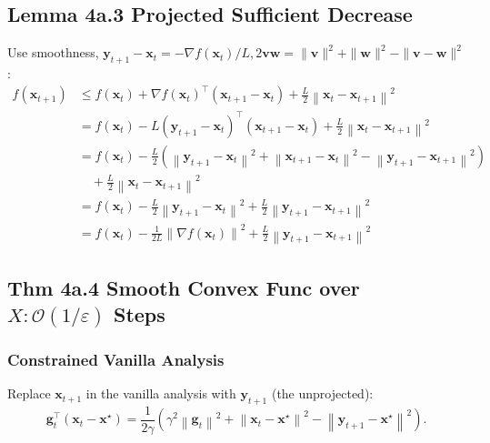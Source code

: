 \subsection*{Lemma 4a.3 Projected Sufficient Decrease}
Use smoothness, $\mathbf{y}_{t+1}-\mathbf{x}_{t}=-\nabla f\left(\mathbf{x}_{t}\right) / L, 2 \mathbf{v} \mathbf{w}=\|\mathbf{v}\|^{2}+\|\mathbf{w}\|^{2}-\|\mathbf{v}-\mathbf{w}\|^{2}$ :
$$
\begin{aligned}
f\left(\mathbf{x}_{t+1}\right) & \leq f\left(\mathbf{x}_{t}\right)+\nabla f\left(\mathbf{x}_{t}\right)^{\top}\left(\mathbf{x}_{t+1}-\mathbf{x}_{t}\right)+\frac{L}{2}\left\|\mathbf{x}_{t}-\mathbf{x}_{t+1}\right\|^{2} \\
&=f\left(\mathbf{x}_{t}\right)-L\left(\mathbf{y}_{t+1}-\mathbf{x}_{t}\right)^{\top}\left(\mathbf{x}_{t+1}-\mathbf{x}_{t}\right)+\frac{L}{2}\left\|\mathbf{x}_{t}-\mathbf{x}_{t+1}\right\|^{2} \\
&=f\left(\mathbf{x}_{t}\right)-\frac{L}{2}\left(\left\|\mathbf{y}_{t+1}-\mathbf{x}_{t}\right\|^{2}+\left\|\mathbf{x}_{t+1}-\mathbf{x}_{t}\right\|^{2}-\left\|\mathbf{y}_{t+1}-\mathbf{x}_{t+1}\right\|^{2}\right)
\\ & \quad +\frac{L}{2}\left\|\mathbf{x}_{t}-\mathbf{x}_{t+1}\right\|^{2} \\
&=f\left(\mathbf{x}_{t}\right)-\frac{L}{2}\left\|\mathbf{y}_{t+1}-\mathbf{x}_{t}\right\|^{2}+\frac{L}{2}\left\|\mathbf{y}_{t+1}-\mathbf{x}_{t+1}\right\|^{2} \\
&=f\left(\mathbf{x}_{t}\right)-\frac{1}{2 L}\left\|\nabla f\left(\mathbf{x}_{t}\right)\right\|^{2}+\frac{L}{2}\left\|\mathbf{y}_{t+1}-\mathbf{x}_{t+1}\right\|^{2}
\end{aligned}
$$


\subsection*{Thm 4a.4 Smooth Convex Func over $X: \mathcal{O}(1 / \varepsilon)$ Steps}
\subsubsection*{Constrained Vanilla Analysis}
Replace $\mathbf{x}_{t+1}$ in the vanilla analysis with $\mathbf{y}_{t+1}$ (the unprojected):
$$
\mathbf{g}_{t}^{\top}\left(\mathbf{x}_{t}-\mathbf{x}^{\star}\right)=\frac{1}{2 \gamma}\left(\gamma^{2}\left\|\mathbf{g}_{t}\right\|^{2}+\left\|\mathbf{x}_{t}-\mathbf{x}^{\star}\right\|^{2}-\left\|\mathbf{y}_{t+1}-\mathbf{x}^{\star}\right\|^{2}\right) .
$$

